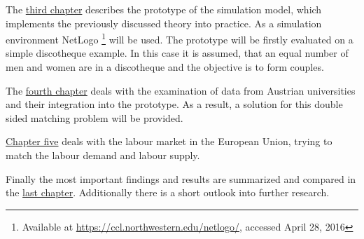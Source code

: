 The \hyperref[prototype]{third chapter} describes the prototype of the simulation model, which implements the previously discussed theory into practice. 
As a simulation environment NetLogo \footnote{Available at \url{https://ccl.northwestern.edu/netlogo/}, accessed April 28, 2016} will be used.
The prototype will be firstly evaluated on a simple discotheque example.
In this case it is assumed, that an equal number of men and women are in a discotheque and the objective is to form couples.

The \hyperref[evaluation_students]{fourth chapter} deals with the examination of data from Austrian universities and their integration into the prototype. 
As a result, a solution for this double sided matching problem will be provided.

\hyperref[evaluation_labor]{Chapter five} deals with the labour market in the European Union, trying to match the labour demand and labour supply. 

Finally the most important findings and results are summarized and compared in the \hyperref[summary]{last chapter}.
Additionally there is a short outlook into further research.